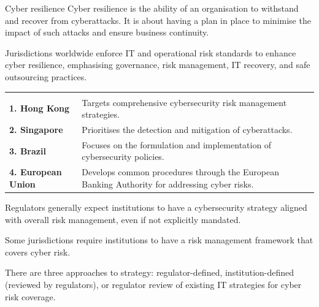 


\begin{ordefbox}{Cyber resilience}
Cyber resilience is the ability of an organisation to withstand and recover from
cyberattacks. It is about having a plan in place to minimise the impact of such
attacks and ensure business continuity.
\end{ordefbox}

Jurisdictions worldwide enforce IT and operational risk standards to enhance
cyber resilience, emphasising governance, risk management, IT recovery, and safe
outsourcing practices.

\noindent\begin{minipage}{\textwidth}
\renewcommand{\arraystretch}{1.4}
\begin{tabularx}{\textwidth}{@{}L{0.22\textwidth}Y@{}}
  & \\
{\tabfont \textbf{1. Hong Kong}} & {\tabfont Targets comprehensive cybersecurity risk management strategies.}\\
{\tabfont \textbf{2. Singapore}} & {\tabfont Prioritises the detection and mitigation of cyberattacks.}\\
{\tabfont \textbf{3. Brazil}} & {\tabfont Focuses on the formulation and implementation of cybersecurity policies.}\\
{\tabfont \textbf{4. European Union}} & {\tabfont Develops common procedures through the European Banking Authority for addressing cyber risks.}\\
\end{tabularx}
\end{minipage}



\begin{lettered}
\item Regulators generally expect institutions to have a cybersecurity strategy
aligned with overall risk management, even if not explicitly mandated.
\item Some jurisdictions require institutions to have a risk management framework
that covers cyber risk.
\item There are three approaches to strategy: regulator-defined,
institution-defined (reviewed by regulators), or regulator review of existing IT
strategies for cyber risk coverage.
\end{lettered}

